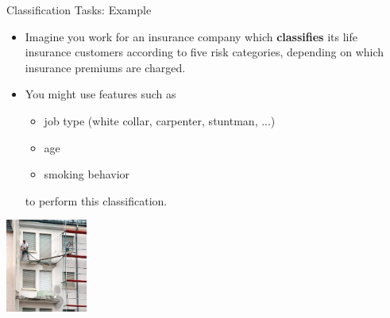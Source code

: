 \documentclass[11pt,compress,t,notes=noshow, xcolor=table]{beamer}
\begin{document}

\begin{vbframe}{Classification Tasks: Example}

\begin{itemize}

  \item Imagine you work for an insurance company which \textbf{classifies} its
  life insurance customers according to five risk categories, depending on which 
  insurance premiums are charged.
  
  \item You might use features such as
  
  \begin{itemize}
  
    \item job type (white collar, carpenter, stuntman, ...)
    \item age
    \item smoking behavior
  
  \end{itemize}
  
  to perform this classification.

\end{itemize}

\begin{center}
  \includegraphics[width = 0.2\textwidth]{figure_man/classif_ex_placeholder.jpg} 
\end{center}

\end{vbframe}


% 
% 
% 


\endlecture
\end{document}
